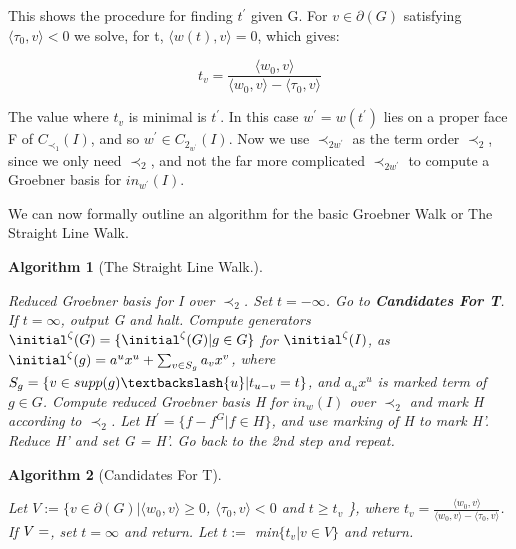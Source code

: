 \documentclass[12pt,a4paper]{report}
\newtheorem{algorithm}{Algorithm}
\begin{document}
This shows the procedure for finding $t^{'}$ given G. For $v \in \partial (G)$ satisfying $\langle \tau_{0}, v \rangle < 0$ we solve, for t, $\langle w(t), v \rangle = 0$, which gives:

\begin{equation*}
    t_{v} = \frac{\langle w_{0}, v \rangle}{\langle w_{0}, v \rangle - \langle \tau_{0}, v \rangle}
\end{equation*}

The value where $t_{v}$ is minimal is $t^{'}$. In this case $w^{'} = w(t^{'})$ lies on a proper face F of $C_{{\prec}_{1}} (I)$, and so $w^{'} \in C_{2}_{w^{'}} (I)$. Now we use $\prec_{2w^{'}}$ as the term order $\prec_{2}$, since we only need $\prec_{2}$, and not the far more complicated $\prec_{2w^{'}}$ to compute a Groebner basis for $in_{w^{'}} (I)$.

We can now formally outline an algorithm for the basic Groebner Walk or The Straight Line Walk. 


\begin{algorithm}[The Straight Line Walk.]\
 \begin{algorithmic}[1]
    \ENSURE Reduced Groebner basis for I over $\prec_{2}$.
    \STATE Set $t = - \infty$.
    \STATE Go to \textbf{Candidates For T}. If $t = \infty$, output G and halt.
    \STATE Compute generators $\initial^{\zeta} (G) = \{ \initial^{\zeta} (G) | g \in G \}$ for $\initial^{\zeta} (I)$, as $\initial^{\zeta} (g) = a^{u} x^{u} + \sum_{v \in S_{g}} a_{v} x^{v}$, where $S_{g} = \{ v \in supp(g) \textbackslash {u} | t_{u - v} = t\}$, and $a_{u} x^{u}$ is marked term of $g \in G$.
    \STATE Compute reduced Groebner basis H for $in_{w} (I)$ over $\prec_{2}$ and mark H according to $\prec_{2}$.
    \STATE Let $H^{'} = \{f - f^{G} | f \in H\}$, and use marking of H to mark H'.
    \STATE Reduce H' and set G = H'.
    \STATE Go back to the 2nd step and repeat.
\end{algorithmic}
\end{algorithm}


\begin{algorithm}[Candidates For T]\
 \begin{algorithmic}[1]
    \STATE Let $V := \{v \in \partial (G) | \langle w_{0}, v \rangle \geq 0$, $\langle \tau_{0}, v \rangle < 0$ and $t \geq t_{v}$ \}, where $t_{v} = \frac{\langle w_{0}, v \rangle}{\langle w_{0}, v \rangle - \langle \tau_{0}, v \rangle}$.
    \STATE If $V = \empty$, set $t = \infty$ and return.
    \STATE Let $t :=$ min$\{ t_{v} | v \in V\}$ and return.
    \RETURN{blbaba}
\end{algorithmic}
\end{algorithm}
\end{document}
